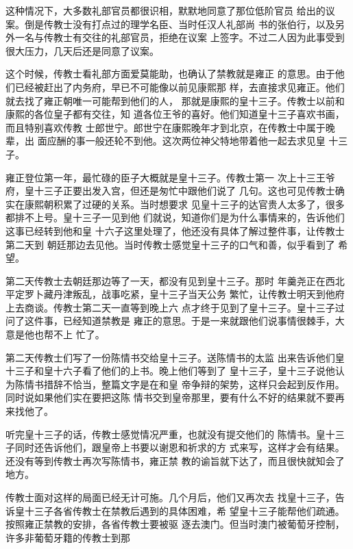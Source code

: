 这种情况下，大多数礼部官员都很识相，默默地同意了那位低阶官员%
给出的议案。倒是传教士没有打点过的理学名臣、当时任汉人礼部尚%
书的张伯行，以及另外一名与传教士有交往的礼部官员，拒绝在议案%
上签字。不过二人因为此事受到很大压力，几天后还是同意了议案。%
\par
这个时候，传教士看礼部方面爱莫能助，也确认了禁教就是雍正%
的意思。由于他们已经被赶出了内务府，早已不可能像以前见康熙那%
样，去直接求见雍正。他们就去找了雍正朝唯一可能帮到他们的人，%
那就是康熙的皇十三子。传教士以前和康熙的各位皇子都有交往，知%
道各位王爷的喜好。他们知道皇十三子喜欢书画，而且特别喜欢传教%
士郎世宁。郎世宁在康熙晚年才到北京，在传教士中属于晚辈，出%
面应酬的事一般还轮不到他。这次两位神父特地带着他一起去求见皇%
十三子。%
\par
雍正登位第一年，最忙碌的臣子大概就是皇十三子。传教士第一%
次上十三王爷府，皇十三子正要出发入宫，但还是匆忙中跟他们说了%
几句。这也可见传教士确实在康熙朝积累了过硬的关系。当时想要求%
见皇十三子的达官贵人太多了，很多都排不上号。皇十三子一见到他%
们就说，知道你们是为什么事情来的，告诉他们这事已经转到他和皇%
十六子这里处理了，他还没有具体了解过整件事，让传教士第二天到%
朝廷那边去见他。当时传教士感觉皇十三子的口气和善，似乎看到了%
希望。%
\par
第二天传教士去朝廷那边等了一天，都没有见到皇十三子。那时%
年羹尧正在西北平定罗卜藏丹津叛乱，战事吃紧，皇十三子当天公务%
繁忙，让传教士明天到他府上去商谈。传教士第二天一直等到晚上六%
点才终于见到了皇十三子。皇十三子过问了这件事，已经知道禁教是%
雍正的意思。于是一来就跟他们说事情很棘手，大意是他也帮不上%
忙了。%
\par
第二天传教士们写了一份陈情书交给皇十三子。送陈情书的太监%
出来告诉他们皇十三子和皇十六子看了他们的上书。晚上他们等到了%
皇十三子，皇十三子说他认为陈情书措辞不恰当，整篇文字是在和皇%
帝争辩的架势，这样只会起到反作用。同时说如果他们实在要把这陈%
情书交到皇帝那里，要有什么不好的结果就不要再来找他了。%
\par
听完皇十三子的话，传教士感觉情况严重，也就没有提交他们的%
陈情书。皇十三子同时还告诉他们，跟皇帝上书要以谢恩和祈求的方%
式来写，这样才会有结果。还没有等到传教士再次写陈情书，雍正禁%
教的谕旨就下达了，而且很快就知会了地方。%
\par
传教士面对这样的局面已经无计可施。几个月后，他们又再次去%
找皇十三子，告诉皇十三子各省传教士在禁教后遇到的具体困难，希%
望皇十三子能帮他们疏通。按照雍正禁教的安排，各省传教士要被驱%
逐去澳门。但当时澳门被葡萄牙控制，许多非葡萄牙籍的传教士到那%
